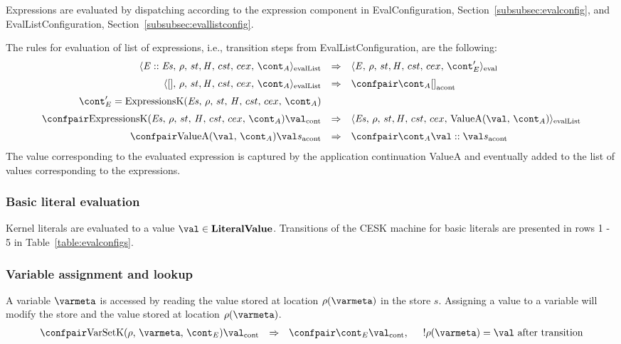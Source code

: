 \documentclass{article}
\begin{document}
\label{subsec:expr-evaluation}


Expressions are evaluated by dispatching according to the expression component in EvalConfiguration, Section~\ref{subsubsec:evalconfig}, and EvalListConfiguration, Section~\ref{subsubsec:evallistconfig}.

\noindent
The rules for evaluation of list of expressions, i.e., transition steps from EvalListConfiguration, are the following:
\label{subsec:eval-list-expressions}
\[
  \begin{array}{rcl}
	\cesktrans{
		\evallistconf{\expr :: \exprs}{\env}{\strace}{\cstrace}{\cex}{\acont}}{
		\evalconf{\expr}{\env}{\strace}{\cstrace}{\cex}{\econt'}}
		\\[2mm]

	\cesktrans{
		\evallistconf{[]}{\env}{\strace}{\cstrace}{\cex}{\acont}}{
		\acontconf{\acont}{[]}}
		\\[2mm]
	\hspace{3mm}\econt' = \ExpressionsK{\exprs}{\env}{\acont}
	\\[2mm]

	\cesktrans{
		\contconf{\ExpressionsK{\exprs}{\env}{\acont}}{\val}}{
		\evallistconf{\exprs}{\env}{\strace}{\cstrace}{\cex}{\ValueA{\val}{\acont}}}
		\\[2mm]

	\cesktrans{
		\acontconf{\ValueA{\val}{\acont}}{\val s}}{
		\acontconf{\acont}{\val :: \val s}}

  \end{array}
\]
The value corresponding to the evaluated expression is captured by the application continuation ValueA and eventually added to the list of values corresponding to the expressions.
\subsubsection{Basic literal evaluation}
\label{subsubsec:basic-literal-eval}

Kernel literals are evaluated to a value $\val \in \dlitval$. Transitions of the CESK machine for basic literals are presented in rows 1 - 5 in Table~\ref{table:evalconfigs}.

\subsubsection{Variable assignment and lookup}
\label{subsubsec:variable-assignment-and-lookup}
A variable $\varmeta$ is accessed by reading the value stored at location $\env(\varmeta)$ in the store $s$. Assigning a value to a variable will modify the store and the value stored at location  $\env(\varmeta)$.
\[
  \begin{array}{rcl}
	\cesktrans{
		\contconf{\VarSetK{\env}{\varmeta}{\econt}}{\val}}{
		\contconf{\econt}{\val}},
		\hspace{5mm} \deref{\env(\varmeta)} = \val
		\textrm{ after transition}
  \end{array}
\]
\end{document}
